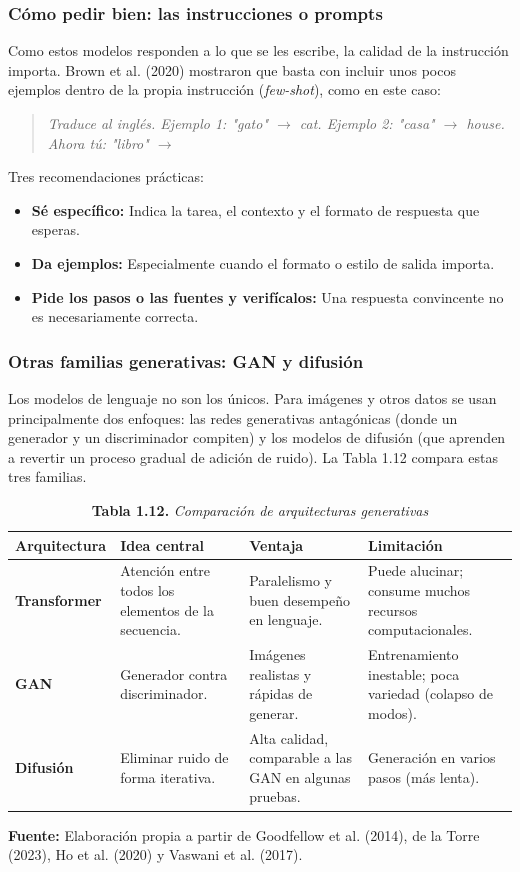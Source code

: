 \subsubsection{Cómo pedir bien: las instrucciones o prompts}
Como estos modelos responden a lo que se les escribe, la calidad de la instrucción importa. Brown et al. (2020) mostraron que basta con incluir unos pocos ejemplos dentro de la propia instrucción (\textit{few-shot}), como en este caso:
\begin{quote}
\textit{Traduce al inglés. Ejemplo 1: "gato" $\to$ cat. Ejemplo 2: "casa" $\to$ house. Ahora tú: "libro" $\to$}
\end{quote}
Tres recomendaciones prácticas:
\begin{itemize}
    \item \textbf{Sé específico:} Indica la tarea, el contexto y el formato de respuesta que esperas.
    \item \textbf{Da ejemplos:} Especialmente cuando el formato o estilo de salida importa.
    \item \textbf{Pide los pasos o las fuentes y verifícalos:} Una respuesta convincente no es necesariamente correcta.
\end{itemize}

\subsubsection{Otras familias generativas: GAN y difusión}
Los modelos de lenguaje no son los únicos. Para imágenes y otros datos se usan principalmente dos enfoques: las redes generativas antagónicas (donde un generador y un discriminador compiten) y los modelos de difusión (que aprenden a revertir un proceso gradual de adición de ruido). La Tabla 1.12 compara estas tres familias.

\begin{table}[htpb!]
\centering
\small\sffamily
\caption{\textbf{Tabla 1.12.} \textit{Comparación de arquitecturas generativas}}
\vspace{0.15cm}
\begin{tabularx}{\textwidth}{>{\bfseries}p{2.6cm} >{\raggedright\arraybackslash}p{4.2cm} >{\raggedright\arraybackslash}p{4.0cm} >{\raggedright\arraybackslash}X}
\toprule
Arquitectura & Idea central & Ventaja & Limitación \\
\midrule
Transformer & Atención entre todos los elementos de la secuencia. & Paralelismo y buen desempeño en lenguaje. & Puede alucinar; consume muchos recursos computacionales. \\
\midrule
GAN & Generador contra discriminador. & Imágenes realistas y rápidas de generar. & Entrenamiento inestable; poca variedad (colapso de modos). \\
\midrule
Difusión & Eliminar ruido de forma iterativa. & Alta calidad, comparable a las GAN en algunas pruebas. & Generación en varios pasos (más lenta). \\
\bottomrule
\end{tabularx}
\vspace{0.15cm}
\raggedright\scriptsize \textbf{Fuente:} Elaboración propia a partir de Goodfellow et al. (2014), de la Torre (2023), Ho et al. (2020) y Vaswani et al. (2017).
\end{table}

